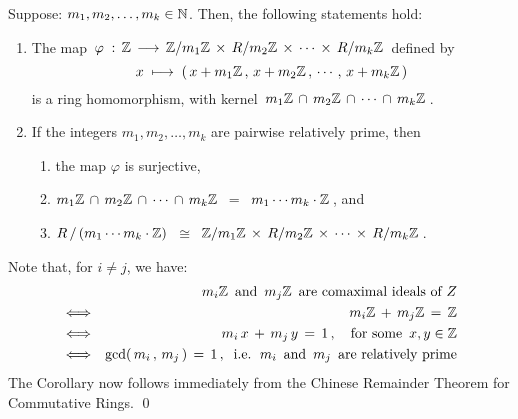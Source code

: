\begin{corollary}
\mbox{}
\vskip 0.2cm
\noindent
Suppose: $m_{1}, m_{2}, \ldots , m_{k} \in \mathbb{N}$.
Then, the following statements hold:
\begin{enumerate}
\item
	The map
	\,$\varphi \;:\, \mathbb{Z} \,\longrightarrow\, \mathbb{Z}/m_{1}\mathbb{Z} \,\times\, R/m_{2}\mathbb{Z} \,\times\, \cdots \,\times\, R/m_{k}\mathbb{Z}$\,
	defined by
	\begin{equation*}
	x \; \longmapsto \; \left(\, x+m_{1}\mathbb{Z} \,,\, x+m_{2}\mathbb{Z} \,,\, \cdots \,,\, x+m_{k}\mathbb{Z}\,\right)
	\end{equation*}
	is a ring homomorphism, with kernel \,$m_{1}\mathbb{Z} \,\cap\, m_{2}\mathbb{Z} \,\cap\, \cdots \,\cap \,m_{k}\mathbb{Z}$\,.
\item
	If the integers $m_{1}, m_{2}, \ldots, m_{k}$ are pairwise relatively prime, then
	\begin{enumerate}
	\item
		the map $\varphi$ is surjective,
	\item
		$m_{1}\mathbb{Z} \,\cap\, m_{2}\mathbb{Z} \,\cap\, \cdots \,\cap \,m_{k}\mathbb{Z} \;\; = \;\; m_{1} \cdots m_{k} \cdot \mathbb{Z}$\,, and
	\item
		$R \,/\, (m_{1} \cdots m_{k} \cdot \mathbb{Z})$
		\,$\cong$\,
			$\mathbb{Z}/m_{1}\mathbb{Z} \,\times\, R/m_{2}\mathbb{Z} \,\times\, \cdots \,\times\, R/m_{k}\mathbb{Z}$\,.
	\end{enumerate}
\end{enumerate}
\end{corollary}
\proof
Note that, for $i \neq j$, we have:
\begin{eqnarray*}
&&
	\textnormal{$m_{i}\mathbb{Z}$\, and \,$m_{j}\mathbb{Z}$\, are comaximal ideals of $Z$}
\\
& \Longleftrightarrow &
	m_{i}\mathbb{Z} \, + \, m_{j}\mathbb{Z} \,=\, \mathbb{Z}
\\
& \Longleftrightarrow &
	m_{i}\,x \, + \, m_{j}\,y \,=\, 1\,,
	\quad
	\textnormal{for some \,$x, y \in \mathbb{Z}$}
\\
& \Longleftrightarrow &
	\gcd(\,m_{i}\,,\,m_{j}\,) \,=\, 1\,,
	\;\;\textnormal{i.e. \,$m_{i}$\, and \,$m_{j}$\, are relatively prime}
\end{eqnarray*}
The Corollary now follows immediately from
the Chinese Remainder Theorem for Commutative Rings.
\qed

